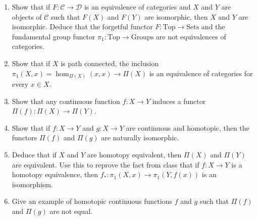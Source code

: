 \documentclass[12pt]{article}
\begin{document}
\begin{problem}{3}
\begin{enumerate}
    \item Show that if $F: \mathcal{C} \to \mathcal{D}$ is an equivalence of categories and $X$ and $Y$ are objects of $\mathcal{C}$ such that $F(X)$ and $F(Y)$ are isomorphic, then $X$ and $Y$ are isomorphic. Deduce that the forgetful functor $F: \text{Top} \to \text{Sets}$ and the fundamental group functor $\pi_1: \text{Top} \to \text{Groups}$ are not equivalences of categories.
 
    \item Show that if $X$ is path connected, the inclusion $\pi_1(X,x) = \hom_{\Pi(X)}(x,x) \to \Pi(X)$ is an equivalence of categories for every $x \in X$.
 
    \item Show that any continuous function $f: X \to Y$ induces a functor $\Pi(f): \Pi(X) \to \Pi(Y)$.
 
    \item Show that if $f: X \to Y$ and $g: X \to Y$ are continuous and homotopic, then the functors $\Pi(f)$ and $\Pi(g)$ are naturally isomorphic. 

    \item Deduce that if $X$ and $Y$ are homotopy equivalent, then $\Pi(X)$ and $\Pi(Y)$ are equivalent. Use this to reprove the fact from class that if $f: X \to Y$ is a homotopy equivalence, then $f_*: \pi_1(X, x) \to \pi_1(Y,f(x))$ is an isomorphism.

    \item Give an example of homotopic continuous functions $f$ and $g$ such that $\Pi(f)$ and $\Pi(g)$ are not equal.
    \end{enumerate}
\end{problem}
\end{document}
